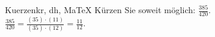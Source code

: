 \begin{MAufgabe}{Kuerzen}{kr, dh, MaTeX}
K\"urzen Sie soweit m\"oglich: $\frac{385}{420}$.\\ 
\ifLsg\MLoesung
\quad $\frac{385}{420}=\frac{(35)\cdot(11)}{(35)\cdot(12)}=\frac{11}{12}$.\else\relax\fi
 \end{MAufgabe}
